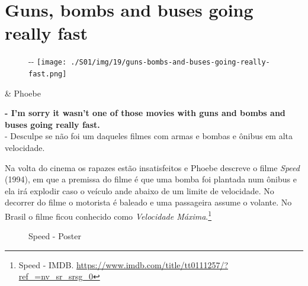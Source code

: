 \hypertarget{guns-bombs-and-buses-going-really-fast}{%
\section{Guns, bombs and buses going really
fast}\label{guns-bombs-and-buses-going-really-fast}}

\begin{figure}[!ht]
  \begin{adjustwidth}{-\oddsidemargin-1in}{-\rightmargin}
    \centering
    \texttt{[image: ./S01/img/19/guns-bombs-and-buses-going-really-fast.png]}
  \end{adjustwidth}
\end{figure}

\begin{tcolorbox}[enhanced,center upper,
    drop fuzzy shadow southeast, boxrule=0.3pt,
    lower separated=false, breakable,
    colframe=black!30!dialogoBorder,colback=white]
\begin{minipage}[c]{0.16\linewidth}
   & \centering \scriptsize{Phoebe}
\end{minipage}
\hfill
\begin{minipage}[c]{0.8\linewidth}
  \textbf{- I'm sorry it wasn't one of those movies with guns and bombs and buses going really fast.}\\
  - Desculpe se não foi um daqueles filmes com armas e bombas e ônibus em alta velocidade.
\end{minipage}
\end{tcolorbox}

Na volta do cinema os rapazes estão insatisfeitos e Phoebe descreve o
filme \emph{Speed} (1994), em que a premissa do filme é que uma bomba
foi plantada num ônibus e ela irá explodir caso o veículo ande abaixo de
um limite de velocidade. No decorrer do filme o motorista é baleado e
uma passageira assume o volante. No Brasil o filme ficou conhecido como
\emph{Velocidade Máxima}.\footnote{\sloppy Speed - IMDB. \url{https://www.imdb.com/title/tt0111257/?ref_=nv_sr_srsg_0}}

\begin{figure}
  \centering
    \caption{Speed - Poster\label{fig:speed-poster}}
\end{figure}

